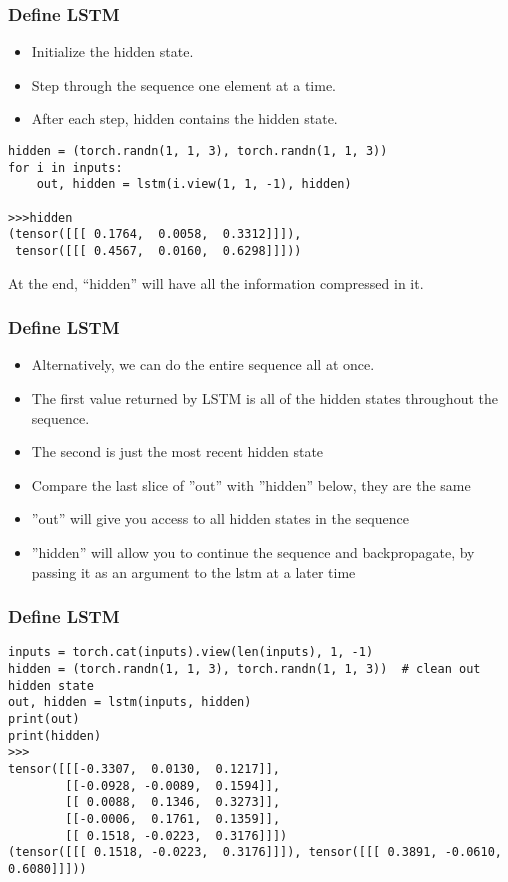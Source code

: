 \begin{frame}[fragile]
\frametitle{Define LSTM}
\begin{itemize}
\item Initialize the hidden state.
\item Step through the sequence one element at a time.
\item After each step, hidden contains the hidden state.
\end{itemize}
 \begin{lstlisting}
hidden = (torch.randn(1, 1, 3), torch.randn(1, 1, 3))
for i in inputs:
    out, hidden = lstm(i.view(1, 1, -1), hidden)
	
>>>hidden
(tensor([[[ 0.1764,  0.0058,  0.3312]]]),
 tensor([[[ 0.4567,  0.0160,  0.6298]]]))
\end{lstlisting}        
At the end, ``hidden'' will have all the information compressed in it.
\end{frame} 

\begin{frame}[fragile]
\frametitle{Define LSTM}
\begin{itemize}
\item Alternatively, we can do the entire sequence all at once.
\item The first value returned by LSTM is all of the hidden states throughout the sequence. 
\item The second is just the most recent hidden state
\item Compare the last slice of  ''out'' with ''hidden'' below, they are the same
\item ''out'' will give you access to all hidden states in the sequence
\item ''hidden'' will allow you to continue the sequence and backpropagate, by passing it as an argument  to the lstm at a later time
\end{itemize}
     
\end{frame} 

\begin{frame}[fragile]
\frametitle{Define LSTM}
\begin{lstlisting}
inputs = torch.cat(inputs).view(len(inputs), 1, -1)
hidden = (torch.randn(1, 1, 3), torch.randn(1, 1, 3))  # clean out hidden state
out, hidden = lstm(inputs, hidden)
print(out)
print(hidden)
>>>
tensor([[[-0.3307,  0.0130,  0.1217]],
        [[-0.0928, -0.0089,  0.1594]],
        [[ 0.0088,  0.1346,  0.3273]],
        [[-0.0006,  0.1761,  0.1359]],
        [[ 0.1518, -0.0223,  0.3176]]])
(tensor([[[ 0.1518, -0.0223,  0.3176]]]), tensor([[[ 0.3891, -0.0610,  0.6080]]]))
\end{lstlisting}        
\end{frame} 


